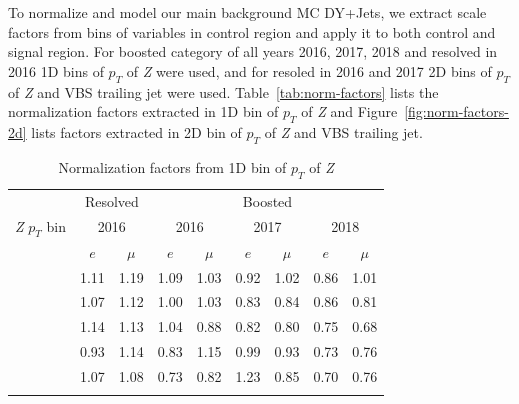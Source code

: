 To normalize and model our main background \gls{MC} DY+Jets,
we extract scale factors from bins of variables
in control region and apply it to both control and signal region.
For boosted category of all years 2016, 2017, 2018
and resolved in 2016 1D bins of \( p_T \) of \textit{Z} were used, and
for resoled in 2016 and 2017 2D bins of \( p_T \) of \textit{Z} and VBS trailing
jet were used. Table~\ref{tab:norm-factors} lists the normalization
factors extracted in 1D bin of \( p_T \) of \textit{Z} and
Figure~\ref{fig:norm-factors-2d} lists factors extracted
in 2D bin of \( p_T \) of \textit{Z} and VBS trailing jet.

\begin{table}
  \caption{Normalization factors from 1D bin of \( p_T \) of \textit{Z}}
  \centering
  \begin{tabular}{lcccccccc}
    \toprule
                           & \multicolumn{2}{c}{Resolved} & \multicolumn{6}{c}{Boosted}                                                                                                   \\
    \cmidrule(lr){2-9}
    \textit{Z} \(p_T\) bin & \multicolumn{2}{c}{2016}     & \multicolumn{2}{c}{2016}    & \multicolumn{2}{c}{2017} & \multicolumn{2}{c}{2018}                                             \\
    \midrule
                           & \( e \)                      & \( \mu \)                   & \( e \)                  & \( \mu \)                & \( e \) & \( \mu \) & \( e \) & \( \mu \) \\
    \cmidrule(lr){2-9}\relax
    [0, 80]                & 1.11                         & 1.19                        & 1.09                     & 1.03                     & 0.92    & 1.02      & 0.86    & 1.01      \\\relax
    [80, 160]              & 1.07                         & 1.12                        & 1.00                     & 1.03                     & 0.83    & 0.84      & 0.86    & 0.81      \\\relax
    [160, 240]             & 1.14                         & 1.13                        & 1.04                     & 0.88                     & 0.82    & 0.80      & 0.75    & 0.68      \\\relax
    [240, 320]             & 0.93                         & 1.14                        & 0.83                     & 1.15                     & 0.99    & 0.93      & 0.73    & 0.76      \\\relax
    [320, 400]             & 1.07                         & 1.08                        & 0.73                     & 0.82                     & 1.23    & 0.85      & 0.70    & 0.76      \\\relax

\end{tabular}
\end{table}
